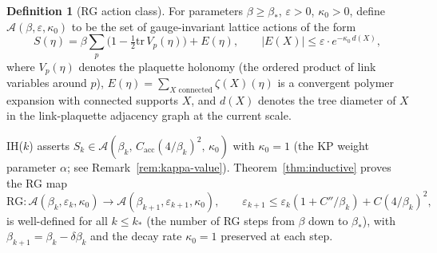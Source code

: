 \documentclass[11pt]{article}
\theoremstyle{definition}
\newtheorem{definition}[theorem]{Definition}
\newcommand{\tr}{\mathrm{tr}}
\begin{document}
\begin{definition}[RG action class]\label{def:action-class}
For parameters $\beta\ge\beta_*$, $\varepsilon>0$, $\kappa_0>0$,
define $\mathcal{A}(\beta,\varepsilon,\kappa_0)$ to be the set of
gauge-invariant lattice actions of the form
\begin{equation}\label{eq:action-class}
S(\eta)=\beta\sum_p\bigl(1-\tfrac{1}{2}\tr\,V_p(\eta)\bigr)+E(\eta),
\qquad
|E(X)|\le\varepsilon\cdot e^{-\kappa_0\,d(X)},
\end{equation}
where $V_p(\eta)$ denotes the plaquette holonomy (the ordered product of
link variables around $p$),
$E(\eta)=\sum_{X\text{ connected}}\zeta(X)(\eta)$ is a convergent
polymer expansion with connected supports $X$, and $d(X)$ denotes
the tree diameter of $X$ in the link-plaquette adjacency graph
at the current scale.

IH($k$) asserts $S_k\in\mathcal{A}(\beta_k,\,
C_{\mathrm{acc}}(4/\beta_k)^2,\,\kappa_0)$ with $\kappa_0=1$ (the
KP weight parameter $\alpha$; see Remark~\ref{rem:kappa-value}).
Theorem~\ref{thm:inductive} proves the RG map
\begin{equation}
\mathrm{RG}\colon
\mathcal{A}(\beta_k,\varepsilon_k,\kappa_0)
\to\mathcal{A}(\beta_{k+1},\varepsilon_{k+1},\kappa_0),
\qquad
\varepsilon_{k+1}\le\varepsilon_k(1+C''/\beta_k)+C(4/\beta_k)^2,
\end{equation}
is well-defined for all $k\le k_*$ (the number of RG steps from
$\beta$ down to $\beta_*$), with $\beta_{k+1}=\beta_k-\delta\beta_k$
and the decay rate $\kappa_0=1$ preserved at each step.
\end{definition}
\end{document}
